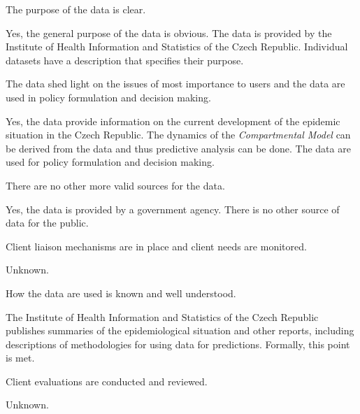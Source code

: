\begin{QandA}
    \item The purpose of the data is clear.
    \begin{answered}
        Yes, the general purpose of the data is obvious.
        The data is provided by the Institute of Health Information and Statistics of the Czech Republic.
        Individual datasets have a description that specifies their purpose.
    \end{answered}

    \item The data shed light on the issues of most importance to users and the data are used in policy formulation and decision making.
    \begin{answered}
        Yes, the data provide information on the current development of the epidemic situation in the Czech Republic.
        The dynamics of the \textit{Compartmental Model} can be derived from the data and thus predictive analysis can be done.
        The data are used for policy formulation and decision making.
    \end{answered}

    \item There are no other more valid sources for the data.
    \begin{answered}
        Yes, the data is provided by a government agency.
        There is no other source of data for the public.
    \end{answered}

    \item Client liaison mechanisms are in place and client needs are monitored.
    \begin{answered}
        Unknown.
    \end{answered}

    \item How the data are used is known and well understood.
    \begin{answered}
        The Institute of Health Information and Statistics of the Czech Republic publishes summaries of the epidemiological situation and other reports, including descriptions of methodologies for using data for predictions.
        Formally, this point is met.
    \end{answered}

    \item Client evaluations are conducted and reviewed.
    \begin{answered}
        Unknown.
    \end{answered}


\end{QandA}
